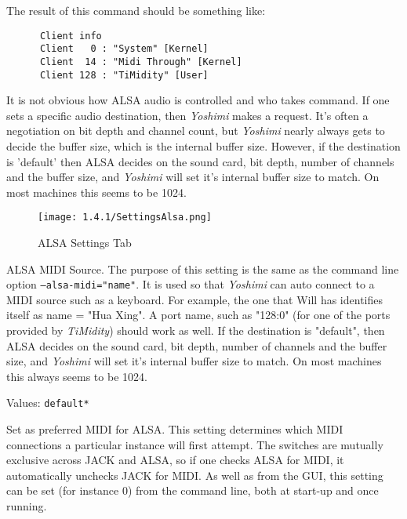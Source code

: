    The result of this command should be something like:

   \begin{verbatim}
      Client info
      Client   0 : "System" [Kernel]
      Client  14 : "Midi Through" [Kernel]
      Client 128 : "TiMidity" [User]
   \end{verbatim}

   It is not obvious how ALSA audio is controlled and who takes command.  If
   one sets a specific audio destination, then \textsl{Yoshimi} makes a
   request.  It's often a negotiation on bit depth and channel count, but
   \textsl{Yoshimi} nearly always gets to decide the buffer size, which is the
   internal buffer size.  However, if the destination is 'default' then ALSA
   decides on the sound card, bit depth, number of channels and the buffer
   size, and \textsl{Yoshimi} will set it's internal buffer size to match.  On
   most machines this seems to be 1024.

\begin{figure}[H]
   \centering 
   \texttt{[image: 1.4.1/SettingsAlsa.png]}
   \caption[ALSA Settings]{ALSA Settings Tab}
   \label{fig:yoshimi_settings_alsa_tab}
\end{figure}

   \setcounter{ItemCounter}{0}      %

   ALSA MIDI Source.
   The purpose of this setting is the same as the command line option
   \texttt{--alsa-midi="name"}.
   It is used so that \textsl{Yoshimi} can auto connect to a MIDI source
   such as a keyboard.  For example, the one that Will has identifies itself
   as name = "Hua Xing".
   A port name, such as "128:0" (for one of the ports provided by
   \textsl{TiMidity}) should work as well.
   If the destination is "default",
   then ALSA decides on the sound card, bit depth, number of channels and the
   buffer size, and \textsl{Yoshimi} will set it's internal buffer size to
   match.  On most machines this always seems to be 1024.

   Values: \texttt{default*}

   Set as preferred MIDI for ALSA.
   This setting determines which MIDI connections a particular instance will
   first attempt. The switches are mutually exclusive across JACK and ALSA,
   so if one checks ALSA for MIDI, it automatically unchecks JACK for MIDI.
   As well as from the GUI, this setting can be set (for instance 0) from the
   command line, both at start-up and once running.

